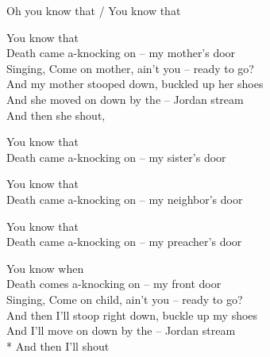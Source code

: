 


Oh you know that / You know that

\contd
{}

You know that\\
Death came a-knocking on – my mother’s door\\
Singing, Come on mother, ain’t you – ready to go?\\
And my mother stooped down, buckled up her shoes\\
And she moved on down by the – Jordan stream\\
\vin And then she shout,



\versemark
You know that\\
Death came a-knocking on – my sister’s door\simile

\versemark
You know that\\
Death came a-knocking on – my neighbor’s door\simile

\versemark
You know that\\
Death came a-knocking on – my preacher’s door\simile

\versemark
You know when\\
Death comes a-knocking on – my front door\\
Singing, Come on child, ain’t you – ready to go?\\
And then I’ll stoop right down, buckle up my shoes\\
And I’ll move on down by the – Jordan stream\\*
\vin And then I’ll shout

